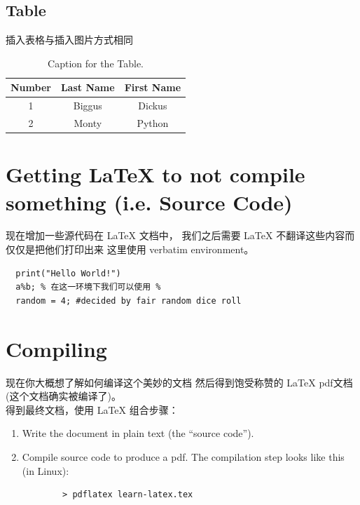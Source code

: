 \documentclass[12pt,UTF8]{article}
\begin{document}
\subsection{Table}
插入表格与插入图片方式相同

\begin{table}[H]
  \caption{Caption for the Table.}
  \begin{tabular}{c|cc} 
    Number &  Last Name & First Name \\ %
    \hline %
    1 & Biggus & Dickus \\
    2 & Monty & Python
  \end{tabular}
\end{table}

\section{Getting \LaTeX \hspace{1pt} to not compile something (i.e. Source Code)}
现在增加一些源代码在 \LaTeX \hspace{1pt} 文档中，
我们之后需要 \LaTeX \hspace{1pt} 不翻译这些内容而仅仅是把他们打印出来
这里使用 verbatim environment。 

\begin{verbatim} 
  print("Hello World!")
  a%b; % 在这一环境下我们可以使用 %
  random = 4; #decided by fair random dice roll
\end{verbatim}

\section{Compiling} 

现在你大概想了解如何编译这个美妙的文档
然后得到饱受称赞的 \LaTeX \hspace{1pt} pdf文档
(这个文档确实被编译了)。 \\
得到最终文档，使用 \LaTeX \hspace{1pt} 组合步骤：
  \begin{enumerate}
    \item Write the document in plain text (the ``source code'').
    \item Compile source code to produce a pdf. 
     The compilation step looks like this (in Linux): \\
     \begin{verbatim} 
        > pdflatex learn-latex.tex
     \end{verbatim}
  \end{enumerate}
\end{document}
